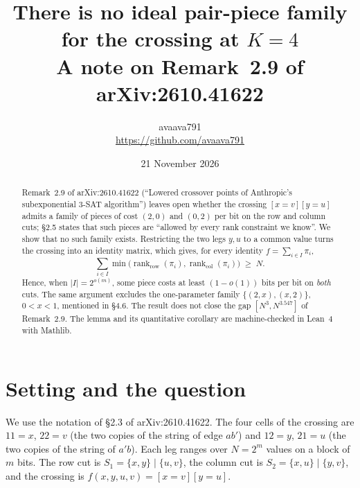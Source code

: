 \documentclass[11pt]{article}
\title{There is no ideal pair-piece family for the crossing at $K=4$\\[2pt]
\large A note on Remark~2.9 of arXiv:2610.41622}
\author{avaava791\\ \small\url{https://github.com/avaava791}}
\date{21 November 2026}
\theoremstyle{remark}
\newcommand{\rk}{\operatorname{rank}}
\begin{document}
\maketitle

\begin{abstract}
Remark~2.9 of arXiv:2610.41622 (``Lowered crossover points of Anthropic's subexponential 3-SAT algorithm'') leaves open whether the crossing $[x=v][y=u]$ admits a family of pieces of cost $(2,0)$ and $(0,2)$ per bit on the row and column cuts; \S2.5 states that such pieces are ``allowed by every rank constraint we know''.
We show that no such family exists.
Restricting the two legs $y,u$ to a common value turns the crossing into an identity matrix, which gives, for every identity $f=\sum_{i\in I}\pi_i$,
\[
\sum_{i\in I}\min\bigl(\rk_{\mathrm{row}}(\pi_i),\rk_{\mathrm{col}}(\pi_i)\bigr)\;\ge\;N .
\]
Hence, when $|I|=2^{o(m)}$, some piece costs at least $(1-o(1))$ bits per bit on \emph{both} cuts.
The same argument excludes the one-parameter family $\{(2,x),(x,2)\}$, $0<x<1$, mentioned in \S4.6.
The result does not close the gap $[N^3,N^{3.547}]$ of Remark~2.9.
The lemma and its quantitative corollary are machine-checked in Lean~4 with Mathlib.
\end{abstract}

\section{Setting and the question}

We use the notation of \S2.3 of arXiv:2610.41622.
The four cells of the crossing are $11=x$, $22=v$ (the two copies of the string of edge $ab'$) and $12=y$, $21=u$ (the two copies of the string of $a'b$).
Each leg ranges over $N=2^m$ values on a block of $m$ bits.
The row cut is $S_1=\{x,y\}\mid\{u,v\}$, the column cut is $S_2=\{x,u\}\mid\{y,v\}$, and the crossing is $f(x,y,u,v)=[x=v][y=u]$.
\end{document}
